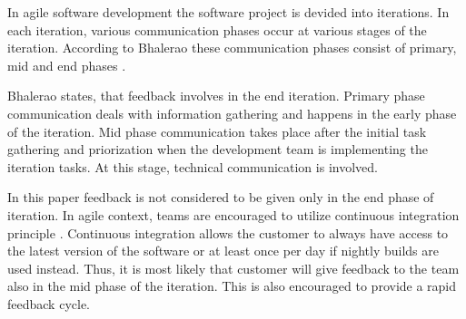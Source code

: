 \documentclass[conference]{IEEEtran}
\begin{document}
In agile software development the software project is devided into iterations. In each iteration, various communication phases occur at various stages of the iteration. According to Bhalerao these communication phases consist of primary, mid and end phases \cite{2010bhalerao}.

Bhalerao states, that feedback involves in the end iteration. Primary phase communication deals with information gathering and happens in the early phase of the iteration. Mid phase communication takes place after the initial task gathering and priorization when the development team is implementing the iteration tasks. At this stage, technical communication is involved. \cite{2010bhalerao}

In this paper feedback is not considered to be given only in the end phase of iteration. In agile context, teams are encouraged to utilize continuous integration principle \cite{2002wake}. Continuous integration allows the customer to always have access to the latest version of the software or at least once per day if nightly builds are used instead. Thus, it is most likely that customer will give feedback to the team also in the mid phase of the iteration. This is also encouraged to provide a rapid feedback cycle.
\end{document}

